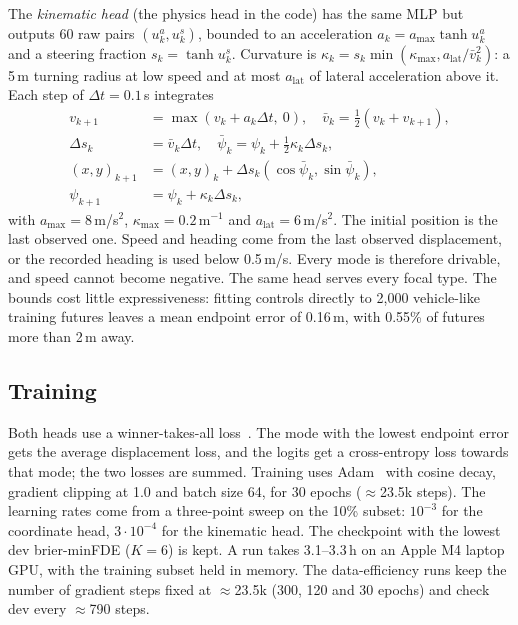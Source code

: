 \documentclass[conference]{IEEEtran}
\begin{document}
The \emph{kinematic head} (the physics head in the code) has the same MLP but outputs 60 raw pairs $(u^a_k, u^s_k)$, bounded to an
acceleration $a_k = a_{\max}\tanh u^a_k$ and a steering fraction $s_k = \tanh u^s_k$. Curvature is
$\kappa_k = s_k \min(\kappa_{\max}, a_{\mathrm{lat}}/\bar v_k^2)$: a 5\,m turning radius at low speed
and at most $a_{\mathrm{lat}}$ of lateral acceleration above it. Each step of $\Delta t = 0.1$\,s
integrates
\begin{align}
v_{k+1} &= \max(v_k + a_k \Delta t,\ 0), \quad \bar v_k = \tfrac12 (v_k + v_{k+1}), \nonumber\\
\Delta s_k &= \bar v_k \Delta t, \quad \bar\psi_k = \psi_k + \tfrac12 \kappa_k \Delta s_k, \nonumber\\
(x, y)_{k+1} &= (x, y)_k + \Delta s_k \left(\cos \bar\psi_k, \sin \bar\psi_k\right), \nonumber\\
\psi_{k+1} &= \psi_k + \kappa_k \Delta s_k,
\end{align}
with $a_{\max} = 8$\,m/s$^2$, $\kappa_{\max} = 0.2$\,m$^{-1}$ and $a_{\mathrm{lat}} = 6$\,m/s$^2$.
The initial position is the last observed one. Speed and heading come from the last observed
displacement, or the recorded heading is used below 0.5\,m/s. Every mode is therefore drivable, and
speed cannot become negative. The same head serves every focal type. The bounds cost little
expressiveness: fitting controls directly to 2,000 vehicle-like training futures leaves a mean
endpoint error of 0.16\,m, with 0.55\% of futures more than 2\,m away.

\subsection{Training}
Both heads use a winner-takes-all loss~\cite{guzmanrivera2012mcl}. The mode with the lowest endpoint
error gets the average displacement loss, and the logits get a cross-entropy loss towards that mode;
the two losses are summed. Training uses Adam~\cite{kingma2015adam} with cosine decay, gradient
clipping at 1.0 and batch size 64, for 30 epochs ($\approx$23.5k steps). The learning rates come from
a three-point sweep on the 10\% subset: $10^{-3}$ for the coordinate head, $3\cdot10^{-4}$ for the
kinematic head. The checkpoint with the lowest dev brier-minFDE ($K{=}6$) is kept. A run takes
3.1--3.3\,h on an Apple M4 laptop GPU, with the training subset held in memory. The data-efficiency
runs keep the number of gradient steps fixed at $\approx$23.5k (300, 120 and 30 epochs) and check dev
every $\approx$790 steps.
\end{document}
